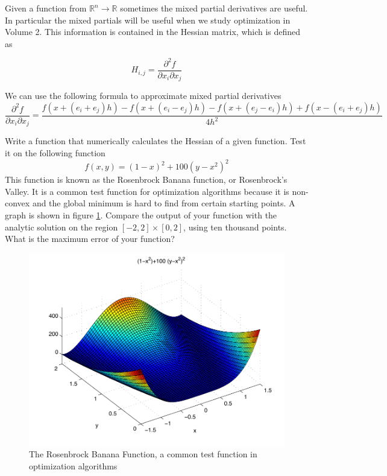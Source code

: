 Given a function from $\mathbb{R}^n \to \mathbb{R}$ sometimes the mixed partial derivatives are useful. In particular the mixed partials will be useful when we study optimization in Volume 2. This information is contained in the Hessian matrix, which is defined as

\begin{equation*}
H_{i,j} = \frac{\partial^2 f}{\partial x_i \partial x_j}
\end{equation*}

We can use the following formula to approximate mixed partial derivatives
\small
\begin{equation*}
\frac{\partial^2 f}{\partial x_i \partial x_j} = \frac{f(x + (e_i + e_j)h) - f(x + (e_i-e_j)h) -f(x + (e_j-e_i)h) + f(x - (e_i + e_j)h)}{4h^2}
\end{equation*}
\normalsize

\begin{problem}
Write a \ProgrammingLanguage function that numerically calculates the Hessian of a given function. Test it on the following function
\begin{equation*}
f(x,y) = (1-x)^2 + 100(y-x^2)^2
\end{equation*}
This function is known as the Rosenbrock Banana function, or Rosenbrock's Valley. It is a common test function for optimization algorithms because it is non-convex and the global minimum is hard to find from certain starting points. A graph is shown in figure \ref{Fig:Rosenbrock}. Compare the output of your function with the analytic solution on the region $[-2,2] \times [0,2]$, using ten thousand points. What is the maximum error of your function?
\end{problem}
\begin{figure}
\begin{center}
\includegraphics[scale = .8]{./Figures/Rosenbrock}
\caption{The Rosenbrock Banana Function, a common test function in optimization algorithms}
\label{Fig:Rosenbrock}
\end{center}
\end{figure}